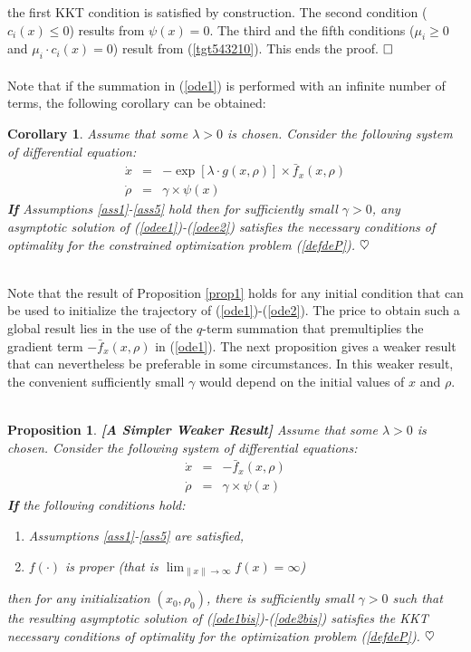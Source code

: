 \documentclass{article}
\newtheorem{corollary}{\bf Corollary}[section]
\newtheorem{proposition}{\bf Proposition}
\begin{document}
the first KKT condition is satisfied by construction. The second condition ($c_i(x)\le 0$) results from $\psi(x)=0$. The third and the fifth conditions ($\mu_i\ge 0$ and $\mu_i\cdot c_i(x)=0$) result from (\ref{tgt543210}). This ends the proof. $\hfill \Box$ 
\ \\ \ \\ 
Note that if the summation in (\ref{ode1}) is performed with an infinite number of terms, the following corollary can be obtained:\\
\begin{corollary} \label{corollary1} 
Assume that some $\lambda>0$ is chosen. Consider the following system of differential equation:
\begin{eqnarray}
\dot x&=&-\exp\left[{\lambda\cdot g(x,\rho)}\right]\times \bar f_x(x,\rho) \label{odee1}\\
\dot\rho&=&\gamma\times \psi(x) \label{odee2}  
\end{eqnarray} 
{\bf If} Assumptions \ref{ass1}-\ref{ass5} hold then for sufficiently small $\gamma>0$, any asymptotic solution of (\ref{odee1})-(\ref{odee2}) satisfies the necessary conditions of optimality for the constrained optimization problem (\ref{defdeP}).  $\hfill \heartsuit$    
\end{corollary}
\ \\
Note that the result of Proposition \ref{prop1} holds for any initial condition that can be used to initialize the trajectory of (\ref{ode1})-(\ref{ode2}). The price to obtain such a global result lies in the use of the $q$-term summation  that premultiplies the gradient term $-\bar f_x(x,\rho)$ in (\ref{ode1}). The next proposition gives a weaker result that can nevertheless be preferable in some circumstances. In this weaker result, the convenient sufficiently small $\gamma$ would depend on the initial values of $x$ and $\rho$. \ \\ 
\begin{proposition}{\bf [A Simpler Weaker Result]} \label{prop2} 
Assume that some $\lambda>0$ is chosen. Consider the following system of differential equations:
\begin{eqnarray}
\dot x&=&-\bar f_x(x,\rho) \label{ode1bis}\\
\dot \rho&=&\gamma \times \psi(x) \label{ode2bis} 
\end{eqnarray} 
{\bf If} the following conditions hold:
\begin{enumerate}
\item Assumptions \ref{ass1}-\ref{ass5} are satisfied,
\item $f(\cdot)$ is proper (that is $\lim_{\|x\|\rightarrow \infty}f(x)=\infty$)
\end{enumerate}  
then for any initialization $(x_0,\rho_0)$, there is sufficiently small $\gamma>0$ such that the resulting asymptotic solution of (\ref{ode1bis})-(\ref{ode2bis}) satisfies the KKT necessary conditions of optimality for the optimization problem (\ref{defdeP}).  $\hfill \heartsuit$
\end{proposition}
\end{document}
